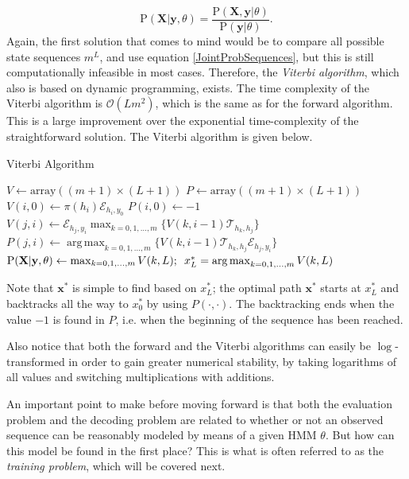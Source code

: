 \documentclass{article}
\DeclareMathOperator*{\argmax}{arg\,max}
\begin{document}
\begin{equation*}
    \text{P}(\mathbf{X}|\mathbf{y}, \theta) = \frac{\text{P}(\mathbf{X}, \mathbf{y}|\theta)}{\text{P}(\mathbf{y}|\theta)}.
\end{equation*}
Again, the first solution that comes to mind would be to compare all possible state sequences $m^L$, and use equation \eqref{JointProbSequences}, but this is still computationally infeasible in most cases. Therefore, the \textit{Viterbi algorithm}, which also is based on dynamic programming, exists. The time complexity of the Viterbi algorithm is $\mathcal{O}(Lm^2)$, which is the same as for the forward algorithm. This is a large improvement over the exponential time-complexity of the straightforward solution. The Viterbi algorithm is given below. 

\begin{algorithm}
\caption{Viterbi Algorithm}\label{alg:Viterbi}
\begin{algorithmic}
    \STATE $V \gets \text{array}((m+1) \times (L+1))$
    \STATE $P \gets \text{array}((m+1) \times (L+1))$
        \STATE $V(i,0) \gets \pi(h_i) \mathcal{E}_{h_i,y_0}$
        \STATE $P(i,0) \gets -1$
    \ENDFOR
            \STATE $V(j,i) \gets \mathcal{E}_{h_j, y_i}\max_{k=0,1,\ldots,m}\{V(k, i-1)\mathcal{T}_{h_k,h_j}\}$
            \STATE $P(j,i) \gets \argmax_{k=0,1,\ldots,m}\{V(k, i-1)\mathcal{T}_{h_k,h_j}\mathcal{E}_{h_j, y_i}\}$
        \ENDFOR
    \ENDFOR
    \RETURN $\text{P}(\mathbf{X}|\mathbf{y},\theta) \gets \max_{k=0,1,\ldots,m}V(k,L); \hspace{0.5em}x_L^* = \argmax_{k=0,1,\ldots,m}V(k,L)$
\end{algorithmic} 
\end{algorithm} 
Note that $\mathbf{x}^*$ is simple to find based on $x_L^*$; the optimal path $\mathbf{x}^*$ starts at $x_L^*$ and backtracks all the way to $x_0^*$ by using $P(\cdot, \cdot)$. The backtracking ends when the value $-1$ is found in $P$, i.e. when the beginning of the sequence has been reached. 

Also notice that both the forward and the Viterbi algorithms can easily be $\log$-transformed in order to gain greater numerical stability, by taking logarithms of all values and switching multiplications with additions. 

An important point to make before moving forward is that both the evaluation problem and the decoding problem are related to whether or not an observed sequence can be reasonably modeled by means of a given HMM $\theta$. But how can this model be found in the first place? This is what is often referred to as the \textit{training problem}, which will be covered next. 
\end{document}
